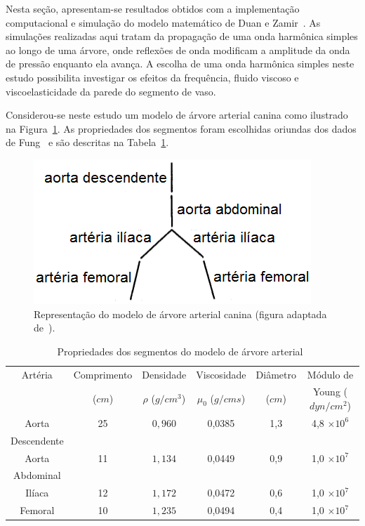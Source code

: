 \documentclass[
        english,			
        brazil			        %
        ,<...>]{abntbibufjf}
\begin{document}
Nesta seção, apresentam-se resultados obtidos com a implementação computacional e simulação do modelo matemático de Duan e Zamir~\cite{Duan1992}. As simulações realizadas aqui tratam da propagação de uma onda harmônica simples ao longo de uma árvore, onde reflexões de onda modificam a amplitude da onda de pressão enquanto ela avança. A escolha de uma onda harmônica simples neste estudo possibilita investigar os efeitos da frequência, fluido viscoso e viscoelasticidade da parede do segmento de vaso.

Considerou-se neste estudo um modelo de árvore arterial canina como ilustrado na Figura~\ref{fig:arvore-canina}. As propriedades dos segmentos foram escolhidas oriundas dos dados de Fung~\cite{Fung} e são descritas na Tabela~\ref{tab1:proprerty}. 

\begin{figure}[!htbp]
	\centering
	\includegraphics[scale=0.8]{Figures/tree_canine.png}
	\caption{Representação do modelo de árvore arterial canina (figura adaptada de~\cite{Duan}).}
	\label{fig:arvore-canina}
\end{figure}

\begin{table}[!htbp]
	\caption{Propriedades dos segmentos do modelo de árvore arterial~\cite{Duan,Fung}}
	\centering{}
	\begin{tabular}{|c||c|c|c|c|c|}
		\hline 
		Artéria	& Comprimento & Densidade & Viscosidade  & Diâmetro & Módulo de  \\ 
		& ($cm$) & $\rho$ ($g/cm^3$) & $\mu_0$ ($g/cm s$) & ($cm$) & Young ($dyn/cm^2$) \\ 
		\hline
		\hline 
		Aorta & 25 & $0,960$ & 0,0385 & 1,3 &4,8 $\times 10^6$ \\ 
		Descendente &  & &  & & \\ 
		\hline 
		Aorta & 11 & $1,134$ & 0,0449 & 0,9 & 1,0 $\times 10^7$ \\
		Abdominal &  & &  & &  \\ 
		\hline 
		Ilíaca & 12 & $1,172$ & 0,0472 & 0,6 & 1,0 $\times 10^7$\\ 
		\hline 
		Femoral & 10 & $1,235$ & 0,0494 & 0,4 & 1,0 $\times 10^7$\\ 
		\hline 
	\end{tabular} 
	\label{tab1:proprerty}
\end{table}
\end{document}
